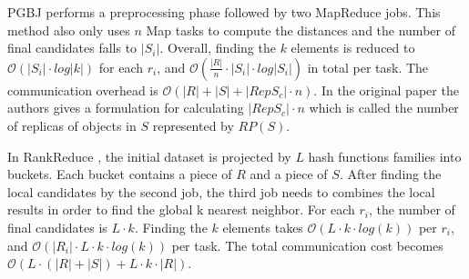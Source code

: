 PGBJ\cite{Lu:2012:EPK:2336664.2336674} performs a preprocessing phase followed by two MapReduce jobs. This method also 
only uses $n$ Map tasks to compute the distances and the number of final candidates falls to $|S_i|$. 
Overall, finding
the $k$ elements is reduced to $\mathcal{O}(\left|S_i\right| \cdot log\left|k\right|)$ for each $r_i$, and 
$\mathcal{O}(\frac{\left|R\right|}{n} \cdot \left|S_i\right| \cdot log\left|S_i\right|)$ in total per task. The 
communication overhead is $\mathcal{O}(\left|R\right| + \left|S\right| + \left|RepS_c\right|\cdot n)$. In the original 
paper the authors gives a formulation for calculating $\left|RepS_c\right|\cdot n$ which is called the number of 
replicas of objects in $S$ represented by $RP(S)$. %

In RankReduce \cite{Stupar10rankreduce-}, the initial dataset is projected by $L$ hash functions families into buckets.
 Each bucket contains a piece of $R$ and a piece of $S$.  
After finding the local candidates by the second job, the third job needs to combines the local results in order to 
find the global k nearest neighbor. For each $r_i$, the number of final candidates is $L\cdot k$. Finding the $k$ 
elements takes $\mathcal{O}(L \cdot k \cdot log(k))$ per $r_i$, and $\mathcal{O}(|R_i| \cdot L \cdot k \cdot log(k))$ 
per task. The total communication cost becomes $\mathcal{O}(L \cdot (|R|+|S|)+L\cdot k\cdot |R|)$.



